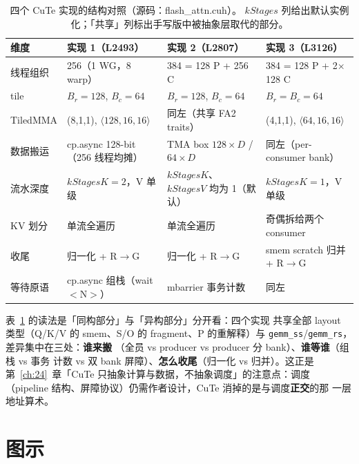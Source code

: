 \begin{table}[htbp]
\centering
\caption{四个 CuTe 实现的结构对照（源码：flash\_attn.cuh）。
$kStages$ 列给出默认实例化；「共享」列标出手写版中被抽象层取代的部分。}
\label{tab:25-struct}
\begin{tabular}{p{2.6cm}p{3.3cm}p{3.3cm}p{3.3cm}}
\toprule
维度 & 实现 1（L2493） & 实现 2（L2807） & 实现 3（L3126） \\
\midrule
线程组织 & 256（1 WG，8 warp） & 384 = 128 P + 256 C & 384 = 128 P + 2$\times$128 C \\
tile & $B_r{=}128$, $B_c{=}64$ & $B_r{=}128$, $B_c{=}64$ & $B_r{=}B_c{=}64$ \\
TiledMMA & (8,1,1), $\langle128,16,16\rangle$ & 同左（共享 FA2 traits） & (4,1,1), $\langle64,16,16\rangle$ \\
数据搬运 & cp.async 128-bit（256 线程均摊） & TMA box $128\!\times\!D$ / $64\!\times\!D$ & 同左（per-consumer bank） \\
流水深度 & $kStagesK{=}2$，V 单级 & $kStagesK$、$kStagesV$ 均为 1（默认） & $kStagesK{=}1$，V 单级 \\
KV 划分 & 单流全遍历 & 单流全遍历 & 奇偶拆给两个 consumer \\
收尾 & 归一化 + R$\to$G & 归一化 + R$\to$G & smem scratch 归并 + R$\to$G \\
等待原语 & cp.async 组栈（wait$<$N$>$） & mbarrier 事务计数 & 同左 \\
\bottomrule
\end{tabular}
\end{table}

表~\ref{tab:25-struct} 的读法是「同构部分」与「异构部分」分开看：四个实现
共享全部 layout 类型（Q/K/V 的 smem、S/O 的 fragment、P 的重解释）与
\texttt{gemm\_ss}/\texttt{gemm\_rs}，差异集中在三处：\textbf{谁来搬}
（全员 vs producer vs producer 分 bank）、\textbf{谁等谁}（组栈 vs 事务
计数 vs 双 bank 屏障）、\textbf{怎么收尾}（归一化 vs 归并）。这正是
第~\ref{ch:24}~章「CuTe 只抽象计算与数据，不抽象调度」的注意点：调度
（pipeline 结构、屏障协议）仍需作者设计，CuTe 消掉的是与调度\textbf{正交}的那
一层地址算术。

\section{图示}

